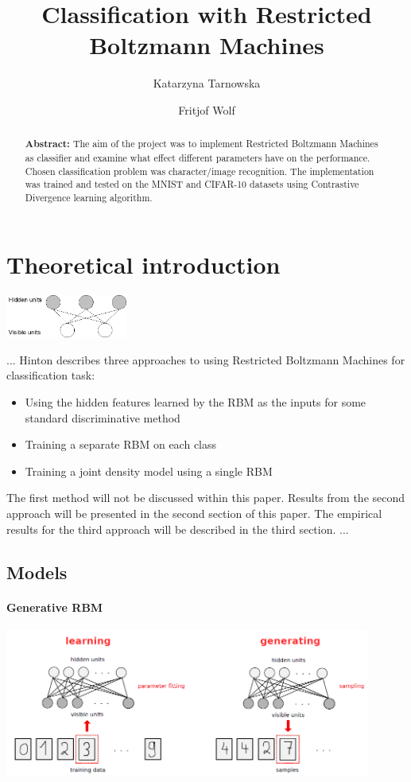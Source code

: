 \documentclass[a4paper]{scrartcl}
\begin{document}
\title{Classification with Restricted Boltzmann Machines}
\author{Katarzyna Tarnowska \and Fritjof Wolf}
\maketitle
\newpage
\begin{abstract}
\textbf{Abstract:}
The aim of the project was to implement Restricted Boltzmann Machines as classifier and examine what effect different parameters have on the performance. Chosen classification problem was character/image recognition. The implementation was trained and tested on the MNIST and CIFAR-10 datasets using Contrastive Divergence learning algorithm. 
\end{abstract}

\section{Theoretical introduction}
\begin{center}
\includegraphics[width=4cm]{images/rbm.png}
\end{center} 
...
Hinton \cite{Hinton} describes three approaches to using Restricted Boltzmann Machines for classification task:
\begin{itemize}
    \item Using the hidden features learned by the RBM as the inputs for some standard discriminative method
    \item Training a separate RBM on each class
	\item Training a joint density model using a single RBM
\end{itemize}
The first method will not be discussed within this paper. Results from the second approach will be presented in the second section of this paper. The empirical results for the third approach will be described in the third section.
...
\subsection{Models}
\paragraph{Generative RBM}
\begin{center}
\includegraphics[width=12cm]{images/generativeRBM.png}
\end{center}
\end{document}
